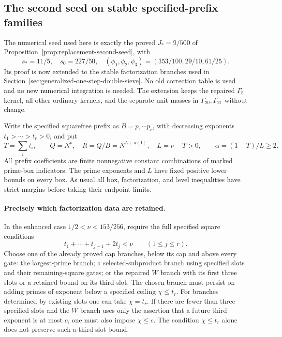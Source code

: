 \subsection{The second seed on stable specified-prefix families}
\label{sec:second-seed-stable-prefix}

The numerical seed used here is exactly the proved $J_*=9/500$ of
Proposition~\ref{prop:replacement-second-seed}, with
\[
 s_*=11/5,\quad s_0=227/50,\quad
 (\phi_1,\phi_2,\phi_3)=(353/100,29/10,61/25).
\]
Its proof is now extended to the stable factorization branches used
in Section~\ref{sec:generalized-one-step-double-sieve}.  No old
correction table is used and no new numerical integration is needed.
The extension keeps the repaired $\Gamma_5$ kernel, all other
ordinary kernels, and the separate unit masses in $\Gamma_{20},
\Gamma_{21}$ without change.

Write the specified squarefree prefix as $B=p_1\cdots p_r$, with
decreasing exponents $t_1>\cdots>t_r>0$, and put
\[
 T=\sum_i t_i,\qquad Q=N^\nu,\quad R=Q/B=N^{L+o(1)},\quad
 L=\nu-T>0,\qquad \alpha=(1-T)/L\ge2.
\]
All prefix coefficients are finite nonnegative constant combinations
of marked prime-box indicators.  The prime exponents and $L$ have
fixed positive lower bounds on every box.  As usual all box,
factorization, and level inequalities have strict margins before
taking their endpoint limits.

\paragraph{Precisely which factorization data are retained.}
In the enhanced case $1/2<\nu<153/256$, require the full specified
square conditions
\[
 t_1+\cdots+t_{j-1}+2t_j<\nu\qquad(1\le j\le r).
\]
Choose one of the already proved cap branches, below its cap and
above every gate: the largest-prime branch; a selected-subproduct
branch using specified slots and their remaining-square gates; or
the repaired $W$ branch with its first three slots or a retained
bound on its third slot.  The chosen branch must persist on adding
primes of exponent below a specified ceiling $\chi\le t_r$.
For branches determined by existing slots one can take $\chi=t_r$.
If there are fewer than three specified slots and the $W$ branch
uses only the assertion that a future third exponent is at most
$c$, one must also impose $\chi\le c$.  The condition
$\chi\le t_r$ alone does not preserve such a third-slot bound.

